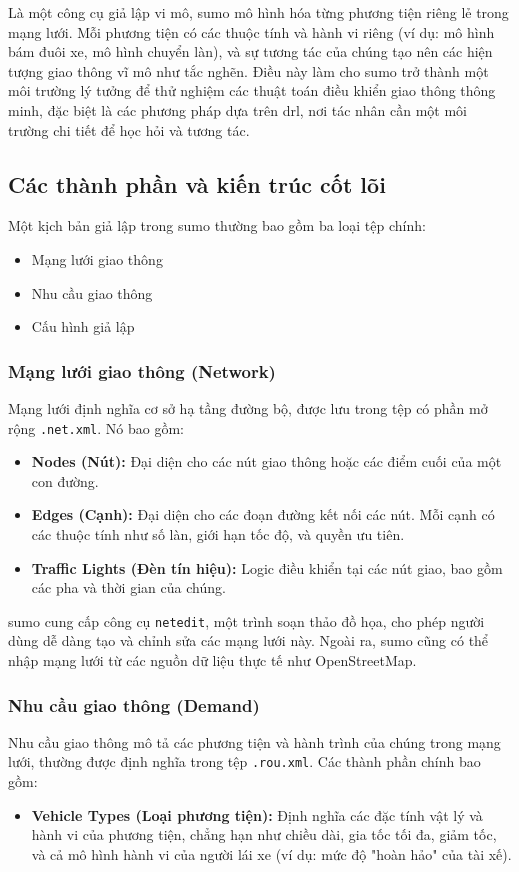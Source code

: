 \begin{enumerate}
Là một công cụ giả lập vi mô, \ac{sumo} mô hình hóa từng phương tiện riêng lẻ trong
mạng lưới. Mỗi phương tiện có các thuộc tính và hành vi riêng (ví dụ: mô hình
bám đuôi xe, mô hình chuyển làn), và sự tương tác của chúng tạo nên các hiện tượng
giao thông vĩ mô như tắc nghẽn. Điều này làm cho \ac{sumo} trở thành một môi trường
lý tưởng để thử nghiệm các thuật toán điều khiển giao thông thông minh, đặc biệt
là các phương pháp dựa trên \ac{drl}, nơi tác nhân cần một môi trường chi tiết
để học hỏi và tương tác.

\subsection{Các thành phần và kiến trúc cốt lõi}
Một kịch bản giả lập trong \ac{sumo} thường bao gồm ba loại tệp chính:
\begin{itemize}
    \item Mạng lưới giao thông

    \item Nhu cầu giao thông

    \item Cấu hình giả lập
\end{itemize}

\subsubsection{Mạng lưới giao thông (Network)}
Mạng lưới định nghĩa cơ sở hạ tầng đường bộ, được lưu trong tệp có phần mở rộng
\texttt{.net.xml}. Nó bao gồm:
\begin{itemize}
    \item \textbf{Nodes (Nút):} Đại diện cho các nút giao thông hoặc các điểm
        cuối của một con đường.

    \item \textbf{Edges (Cạnh):} Đại diện cho các đoạn đường kết nối các nút. Mỗi
        cạnh có các thuộc tính như số làn, giới hạn tốc độ, và quyền ưu tiên.

    \item \textbf{Traffic Lights (Đèn tín hiệu):} Logic điều khiển tại các nút
        giao, bao gồm các pha và thời gian của chúng.
\end{itemize}
\ac{sumo} cung cấp công cụ \texttt{netedit}, một trình soạn thảo đồ họa, cho phép
người dùng dễ dàng tạo và chỉnh sửa các mạng lưới này. Ngoài ra, \ac{sumo} cũng
có thể nhập mạng lưới từ các nguồn dữ liệu thực tế như OpenStreetMap.

\subsubsection{Nhu cầu giao thông (Demand)}
Nhu cầu giao thông mô tả các phương tiện và hành trình của chúng trong mạng lưới,
thường được định nghĩa trong tệp \texttt{.rou.xml}. Các thành phần chính bao gồm:
\begin{itemize}
    \item \textbf{Vehicle Types (Loại phương tiện):} Định nghĩa các đặc tính vật
        lý và hành vi của phương tiện, chẳng hạn như chiều dài, gia tốc tối đa, giảm
        tốc, và cả mô hình hành vi của người lái xe (ví dụ: mức độ "hoàn hảo"
        của tài xế).


\end{itemize}
\end{enumerate}
